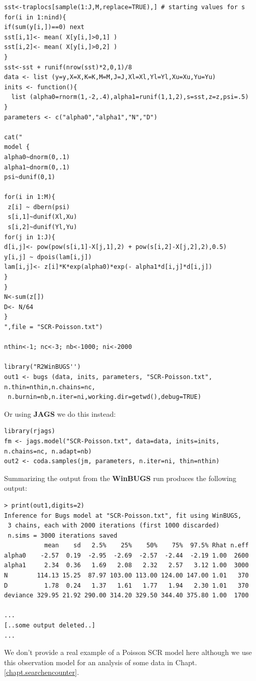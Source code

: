 {\small
\begin{verbatim}
sst<-traplocs[sample(1:J,M,replace=TRUE),] # starting values for s
for(i in 1:nind){
if(sum(y[i,])==0) next
sst[i,1]<- mean( X[y[i,]>0,1] )
sst[i,2]<- mean( X[y[i,]>0,2] )
}
sst<-sst + runif(nrow(sst)*2,0,1)/8
data <- list (y=y,X=X,K=K,M=M,J=J,Xl=Xl,Yl=Yl,Xu=Xu,Yu=Yu)
inits <- function(){
  list (alpha0=rnorm(1,-2,.4),alpha1=runif(1,1,2),s=sst,z=z,psi=.5)
}
parameters <- c("alpha0","alpha1","N","D")

cat("
model {
alpha0~dnorm(0,.1)
alpha1~dnorm(0,.1)
psi~dunif(0,1)

for(i in 1:M){
 z[i] ~ dbern(psi)
 s[i,1]~dunif(Xl,Xu)
 s[i,2]~dunif(Yl,Yu)
for(j in 1:J){
d[i,j]<- pow(pow(s[i,1]-X[j,1],2) + pow(s[i,2]-X[j,2],2),0.5)
y[i,j] ~ dpois(lam[i,j])
lam[i,j]<- z[i]*K*exp(alpha0)*exp(- alpha1*d[i,j]*d[i,j])
}
}
N<-sum(z[])
D<- N/64
}
",file = "SCR-Poisson.txt")

nthin<-1; nc<-3; nb<-1000; ni<-2000

library("R2WinBUGS'')
out1 <- bugs (data, inits, parameters, "SCR-Poisson.txt", n.thin=nthin,n.chains=nc,
 n.burnin=nb,n.iter=ni,working.dir=getwd(),debug=TRUE)
\end{verbatim}
}
Or using {\bf JAGS}  we do this instead:
{\small
\begin{verbatim}
library(rjags)
fm <- jags.model("SCR-Poisson.txt", data=data, inits=inits, n.chains=nc, n.adapt=nb)
out2 <- coda.samples(jm, parameters, n.iter=ni, thin=nthin)
\end{verbatim}
}
Summarizing the output from the {\bf WinBUGS}  run produces the following output:
{\small
\begin{verbatim}
> print(out1,digits=2)
Inference for Bugs model at "SCR-Poisson.txt", fit using WinBUGS,
 3 chains, each with 2000 iterations (first 1000 discarded)
 n.sims = 3000 iterations saved
           mean    sd   2.5%    25%    50%    75%  97.5% Rhat n.eff
alpha0    -2.57  0.19  -2.95  -2.69  -2.57  -2.44  -2.19 1.00  2600
alpha1     2.34  0.36   1.69   2.08   2.32   2.57   3.12 1.00  3000
N        114.13 15.25  87.97 103.00 113.00 124.00 147.00 1.01   370
D          1.78  0.24   1.37   1.61   1.77   1.94   2.30 1.01   370
deviance 329.95 21.92 290.00 314.20 329.50 344.40 375.80 1.00  1700

...
[..some output deleted..]
...
\end{verbatim}
}

We don't provide a real example of a Poisson SCR model here although
we use this observation model for an analysis of some data in Chapt.
\ref{chapt.searchencounter}.

